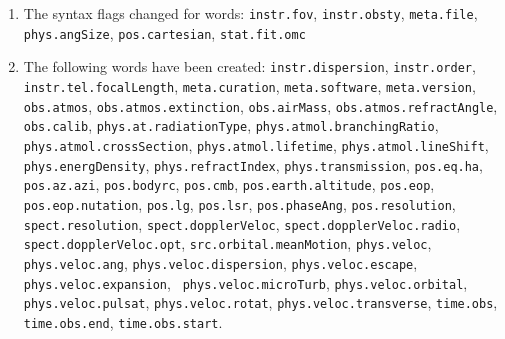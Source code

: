 \documentclass[11pt,a4paper]{ivoa}
\begin{document}
\begin{enumerate}
\item \begin{flushleft}
The syntax flags changed for words: 
{\tt instr.fov}, {\tt instr.obsty}, {\tt meta.file}, 
{\tt phys.angSize}, {\tt pos.cartesian}, {\tt stat.fit.omc}
\end{flushleft}
\item \begin{flushleft}
The following words have been created: 
{\tt instr.dispersion}, {\tt instr.order}, {\tt 
instr.tel.focalLength}, {\tt meta.curation}, {\tt meta.software}, {\tt meta.version}, {\tt 
obs.atmos}, {\tt obs.atmos.extinction}, {\tt obs.airMass}, {\tt obs.atmos.refractAngle}, 
{\tt obs.calib}, {\tt phys.at.radiationType}, {\tt phys.atmol.branchingRatio}, {\tt 
phys.atmol.crossSection}, {\tt phys.atmol.lifetime}, {\tt phys.atmol.lineShift}, {\tt 
phys.energDensity}, {\tt phys.refractIndex}, {\tt phys.transmission}, {\tt pos.eq.ha}, 
{\tt pos.az.azi}, {\tt pos.bodyrc}, {\tt pos.cmb}, {\tt pos.earth.altitude}, {\tt pos.eop}, 
{\tt pos.eop.nutation}, {\tt pos.lg}, {\tt pos.lsr}, {\tt pos.phaseAng}, {\tt pos.resolution}, 
{\tt spect.resolution}, {\tt spect.dopplerVeloc}, {\tt spect.dopplerVeloc.radio}, {\tt 
spect.dopplerVeloc.opt}, {\tt src.orbital.meanMotion}, {\tt phys.veloc}, {\tt phys.veloc.ang}, 
{\tt phys.veloc.dispersion}, {\tt phys.veloc.escape}, {\tt phys.veloc.expansion}, {\tt 
phys.veloc.microTurb}, {\tt phys.veloc.orbital}, {\tt phys.veloc.pulsat}, {\tt phys.veloc.rotat}, 
{\tt phys.veloc.transverse}, {\tt time.obs}, {\tt time.obs.end}, {\tt time.obs.start}.
\end{flushleft}
\end{enumerate}
\end{document}
